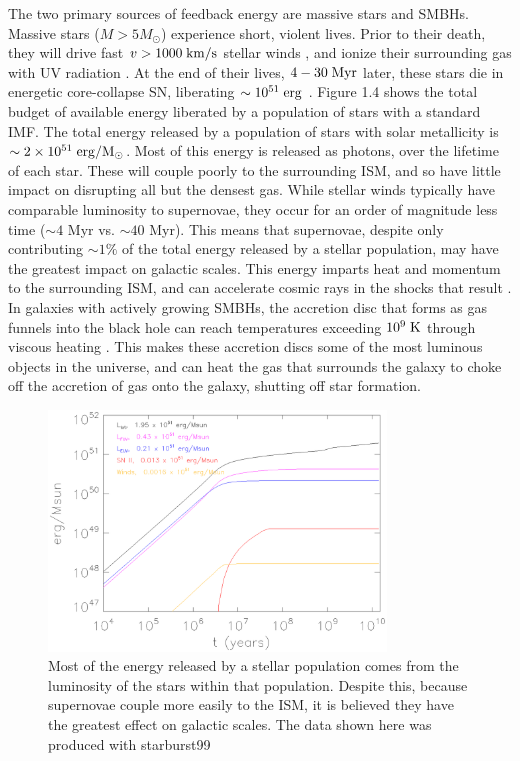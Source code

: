 The two primary sources of feedback energy are massive stars and SMBHs.  Massive
stars ($M>5M_\odot$) experience short, violent lives.  Prior to their death,
they will drive fast $v>1000\;\rm{km/s}$ stellar winds \citep{Weaver1977}, and
ionize their surrounding gas with UV radiation \citep{Krumholz2009}.  At the end
of their lives, $4-30\;\rm{Myr}$ later, these stars die in energetic
core-collapse SN, liberating $\sim10^{51}\;\rm{erg}$
\citep{Wilson1985,Bethe1990}.  Figure 1.4 shows the total budget of available
energy liberated by a population of stars with a standard \citet{Chabrier2003}
IMF.  The total energy released by a population of stars with solar metallicity is
$\sim 2\times10^{51}\;\rm{erg/M_\odot}$.  Most of this energy is released as
photons, over the lifetime of each star.  These will couple poorly to the
surrounding ISM, and so have little impact on disrupting all but the densest
gas.  While stellar winds typically have comparable luminosity to supernovae,
they occur for an order of magnitude less time ($\sim4$ Myr vs. $\sim40$ Myr).
This means that supernovae, despite only contributing $\sim1\%$ of the total
energy released by a stellar population, may have the greatest impact on
galactic scales.  This energy imparts heat and momentum to the surrounding ISM,
and can accelerate cosmic rays in the shocks that result \citep{Bell1978}.  In
galaxies with actively growing SMBHs, the accretion disc that forms as gas
funnels into the black hole can reach temperatures exceeding $10^9\;\rm{K}$
through viscous heating \citep{Antonucci1993}.  This makes these accretion discs
some of the most luminous objects in the universe, and can heat the gas that
surrounds the galaxy to choke off the accretion of gas onto the galaxy, shutting
off star formation.

\begin{figure}
    \includegraphics[width=0.8\textwidth]{FB_budget.ps}
    \caption[Stellar feedback energy budget]{Most of the energy released by a
    stellar population comes from the luminosity of the stars within that
    population.  Despite this, because supernovae couple more easily to the ISM,
    it is believed they have the greatest effect on galactic scales.  The data
    shown here was produced with {\sc starburst99} \citep{Leitherer1999}}
\end{figure}

